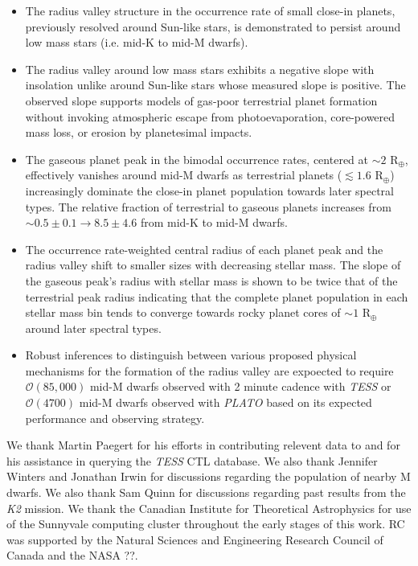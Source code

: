 \documentclass[twocolumn]{emulateapj}
\newcommand{\ktwo}[1]{\emph{K2}#1}
\newcommand{\tess}[1]{\emph{TESS}#1}
\newcommand{\plato}[1]{\emph{PLATO}#1}
\begin{document}
\begin{itemize}
\item The radius valley structure in the occurrence rate of small close-in planets,
  previously resolved around Sun-like
  stars, is demonstrated to persist around low mass stars (i.e. mid-K to mid-M dwarfs).
\item The radius valley around low mass stars exhibits a negative slope with insolation unlike 
  around Sun-like stars whose measured slope is positive. The observed slope
  supports models of gas-poor terrestrial planet formation without invoking atmospheric escape from photoevaporation,
  core-powered mass loss, or erosion by planetesimal impacts.
\item The gaseous planet peak in the bimodal occurrence rates, centered at $\sim 2$ R$_{\oplus}$, effectively
  vanishes around mid-M dwarfs as terrestrial planets ($\lesssim 1.6$ R$_{\oplus}$) increasingly dominate the close-in
  planet population towards later spectral types. The relative fraction of terrestrial to gaseous planets increases
  from $\sim 0.5\pm 0.1 \to 8.5\pm 4.6$ from mid-K to mid-M dwarfs.
\item The occurrence rate-weighted central radius of each planet peak and the radius valley shift to smaller
  sizes with decreasing stellar mass. The slope of the gaseous peak's radius with stellar mass is shown to be
  twice that of the terrestrial peak radius indicating that the complete planet population in each stellar mass bin
  tends to converge towards rocky planet cores of $\sim 1$ R$_{\oplus}$ around later spectral types.
\item Robust inferences to distinguish between various proposed physical mechanisms for the formation of the
  radius valley are expoected to require $\mathcal{O}(85,000)$ mid-M dwarfs observed with 2 minute cadence with
  \tess{} or $\mathcal{O}(4700)$ mid-M dwarfs observed with \plato{} based on its expected performance and
  observing strategy. 
\end{itemize}




\acknowledgements
We thank Martin Paegert for his efforts in contributing relevent data to and for his assistance in querying the \tess{}
CTL database. We also thank Jennifer Winters and Jonathan Irwin for discussions regarding the population of nearby
M dwarfs. We also thank Sam Quinn for discussions regarding past results from the \ktwo{} mission.
We thank the Canadian Institute for Theoretical Astrophysics for use of the Sunnyvale computing cluster
throughout the early stages of this work. RC was supported by the Natural Sciences and Engineering Research Council of
Canada and the NASA ??. 




\end{document}
